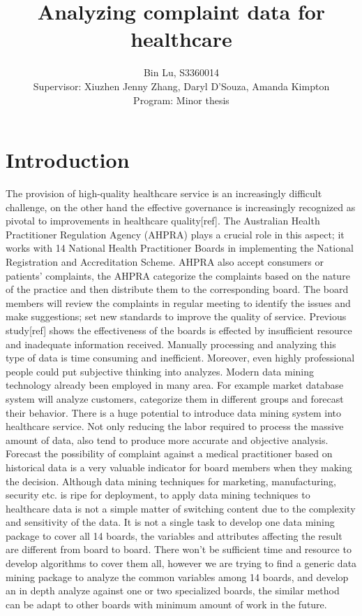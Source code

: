 \documentclass[a4paper,11pt]{article}
\title{Analyzing complaint data for healthcare}
\author{Bin Lu, S3360014\\Supervisor: Xiuzhen Jenny Zhang, Daryl D'Souza, Amanda Kimpton\\Program: Minor thesis}
\begin{document}
\maketitle
\section{Introduction}
The provision of high-quality healthcare service is an increasingly difficult challenge, on the other hand the effective governance is increasingly recognized as pivotal to improvements in healthcare quality[ref]. The Australian Health Practitioner Regulation Agency (AHPRA) plays a crucial role in this aspect; it works with 14 National Health Practitioner Boards in implementing the National Registration and Accreditation Scheme. AHPRA also accept consumers or patients’ complaints, the AHPRA categorize the complaints based on the nature of the practice and then distribute them to the corresponding board. The board members will review the complaints in regular meeting to identify the issues and make suggestions; set new standards to improve the quality of service. Previous study[ref] shows the effectiveness of the boards is effected by insufficient resource and inadequate information received. Manually processing and analyzing this type of data is time consuming and inefficient. Moreover, even highly professional people could put subjective thinking into analyzes. Modern data mining technology already been employed in many area. For example market database system will analyze customers, categorize them in different groups and forecast their behavior. There is a huge potential to introduce data mining system into healthcare service. Not only reducing the labor required to process the massive amount of data, also tend to produce more accurate and objective analysis. Forecast the possibility of complaint against a medical practitioner based on historical data is a very valuable indicator for board members when they making the decision.
Although data mining techniques for marketing, manufacturing, security etc. is ripe for deployment, to apply data mining techniques to healthcare data is not a simple matter of switching content due to the complexity and sensitivity of the data. It is not a single task to develop one data mining package to cover all 14 boards, the variables and attributes affecting the result are different from board to board. There won’t be sufficient time and resource to develop algorithms to cover them all, however we are trying to find a generic data mining package to analyze the common variables among 14 boards, and develop an in depth analyze against one or two specialized boards, the similar method can be adapt to other boards with minimum amount of work in the future.
\end{document}
